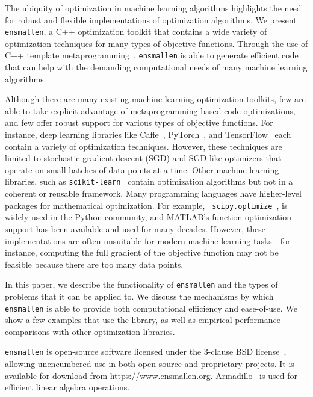 \documentclass{article}
\begin{document}
The ubiquity of optimization in machine learning algorithms highlights the need
for robust and flexible implementations of optimization algorithms.
We present {\tt ensmallen}, a C++ optimization toolkit
that contains a wide variety of optimization techniques for many types of
objective functions.  Through the use of C++ template
metaprogramming~\cite{Abrahams_2004},
{\tt ensmallen} is able to generate efficient code that can help with the
demanding computational needs of many machine learning algorithms.

Although there are many existing machine learning optimization toolkits, few
are able to take explicit advantage of metaprogramming based code optimizations,
and few offer robust support for various types of objective functions.
For instance, deep learning
libraries like Caffe~\cite{jia2014caffe},
PyTorch~\cite{paszke2017automatic},
and TensorFlow~\cite{abadi2016tensorflow}
each contain a variety of optimization techniques.  However, these techniques are
limited to stochastic gradient descent (SGD) and SGD-like optimizers that
operate on small batches of data points at a time.  Other machine learning
libraries, such as {\tt scikit-learn}~\cite{pedregosa2011scikit}
contain optimization algorithms but not in a coherent or reusable framework.
Many programming languages have higher-level packages for
mathematical optimization.  For example, {\tt
scipy.optimize}~\cite{jones2014scipy},
is widely used in the Python community, and MATLAB's function optimization
support has been available and used for many decades.
However, these
implementations are often unsuitable for modern machine learning tasks---for
instance, computing the full gradient of the objective function may not be
feasible because there are too many data points.

In this paper, we describe the functionality of {\tt ensmallen} and the types of
problems that it can be applied to.  We discuss the mechanisms by which {\tt ensmallen} is
able to provide both computational efficiency and ease-of-use.
We show a few examples that use the library, as well as empirical performance comparisons
with other optimization libraries.

{\tt ensmallen} is open-source software licensed under the 3-clause BSD
license~\cite{Rosen_2004_full}, 
allowing unencumbered use in both open-source and proprietary projects.
It is available for download from \url{https://www.ensmallen.org}.
Armadillo~\cite{sanderson2016armadillo} is used for efficient linear algebra operations.
\end{document}
